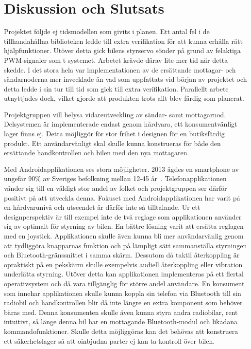 \documentclass[a4paper]{article}
\begin{document}
\newpage
\section{Diskussion och Slutsats}

Projektet följde ej tidsmodellen som givits i planen. Ett antal fel i de tillhandahållna biblioteken ledde till extra verifikation för att kunna erhålla rätt hjälpfunktioner. Utöver detta gick bilens styrservo sönder på grund av felaktiga PWM-signaler som t systemet. Arbetet krävde därav lite mer tid när detta skedde. I det stora hela var implementationen av de ersättande mottagar- och sändarnoderna mer invecklade än vad som uppfattats vid början av projektet och detta ledde i sin tur till tid som gick till extra verifikation. Parallellt arbete utnyttjades dock, vilket gjorde att produkten trots allt blev färdig som planerat.

\vspace{5mm} \noindent
Projektgruppen vill belysa vidareutveckling av sändar- samt mottagarnod. Delsystemen är implementerade endast genom hårdvara, ett konsumentvänligt lager finns ej. Detta möjliggör för stor frihet i designen för en butiksfärdig produkt. Ett användarvänligt skal skulle kunna konstrueras för både den ersättande handkontrollen och bilen med den nya mottagaren. 



\vspace{5mm} \noindent
Med Androidapplikationen ses stora möjligheter. 2013 ägdes en smartphone av ungefär 90\% av Sveriges befolkning mellan 12-45 år~\cite{smartphoneStat}. Telefonapplikationen vänder sig till en väldigt stor andel av folket och projektgruppen ser därför positivt på att utveckla denna. Fokuset med Androidapplikationen har varit på en hårdvarunivå och utseendet är därför inte så tilltalande. Ur ett designperspektiv är till exempel inte de två reglage som applikationen använder sig av optimalt för styrning av bilen. En bättre lösning varit att ersätta reglagen med en joystick. Applikationen skulle även kunna bli mer användarvänlig genom att tydliggöra knapparnas funktion och på lämpligt sätt sammanställa styrningen och Bluetooth-gränssnittet i samma skärm. Dessutom då taktil återkoppling är opraktiskt på en pekskärm skulle exempelvis audiell återkoppling eller vibration underlätta styrning. Utöver detta kan applikationen implementeras på ett flertal operativsystem och då vara tillgänglig för större andel användare. En konsument som innehar applikationen skulle kunna koppla sin telefon via Bluetooth till sin radiobil och handkontrollen blir då inte längre en extra komponent som behöver bäras med. Denna konsumenten skulle även kunna styra andra radiobilar, rent intuitivt, så länge denna bil har en mottagande Bluetooth-modul och likadana kommandofunktioner. Skulle detta möjliggöras kan det behövas att konstruera ett säkerhetslager så att oinbjudna parter ej kan ta kontroll över bilen.
\end{document}
